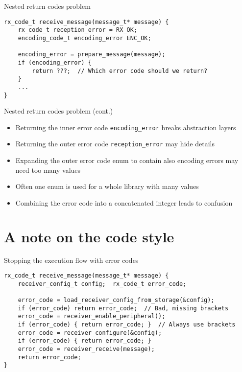 \documentclass[aspectratio=169,14pt]{beamer}
\begin{document}
\begin{frame}[fragile]{Nested return codes problem}
\begin{lstlisting}[style=cstyle]
rx_code_t receive_message(message_t* message) {
    rx_code_t reception_error = RX_OK;
    encoding_code_t encoding_error ENC_OK;
    
    encoding_error = prepare_message(message);
    if (encoding_error) {
        return ???;  // Which error code should we return?
    }
    ...
}
\end{lstlisting}
\end{frame}

\begin{frame}{Nested return codes problem (cont.)}
\begin{itemize}
    \item Returning the inner error code \texttt{encoding\_error} breaks abstraction layers
    \item Returning the outer error code \texttt{reception\_error} may hide details
    \item Expanding the outer error code enum to contain also encoding errors may need too many values
    \item Often one enum is used for a whole library with many values
    \item Combining the error code into a concatenated integer leads to confusion
\end{itemize}
\end{frame}


\section{A note on the code style}

\begin{frame}[fragile]{Stopping the execution flow with error codes}
\begin{lstlisting}[style=cstyle]
rx_code_t receive_message(message_t* message) {
    receiver_config_t config;  rx_code_t error_code;
    
    error_code = load_receiver_config_from_storage(&config);
    if (error_code) return error_code;  // Bad, missing brackets
    error_code = receiver_enable_peripheral();
    if (error_code) { return error_code; }  // Always use brackets
    error_code = receiver_configure(&config);
    if (error_code) { return error_code; }
    error_code = receiver_receive(message);
    return error_code;
}
\end{lstlisting}
\end{frame}
\end{document}

